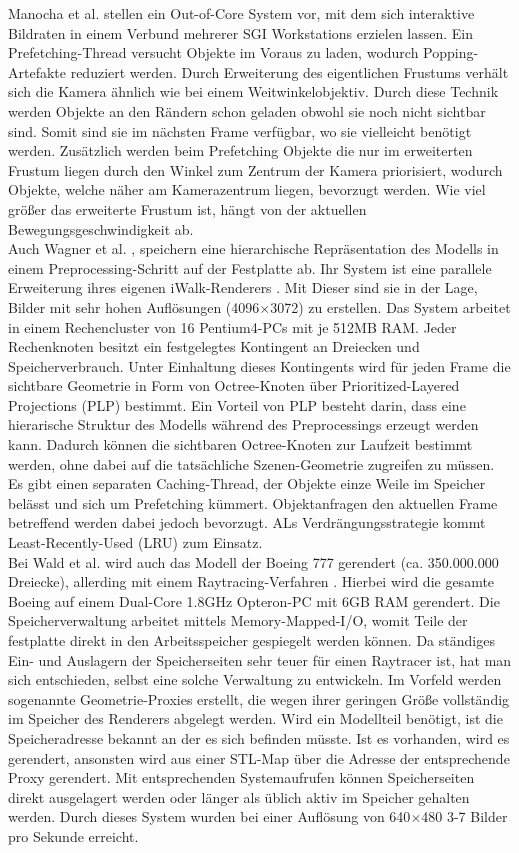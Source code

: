 Manocha et al. \cite{manocha} stellen ein Out-of-Core System vor, mit dem sich interaktive Bildraten in einem Verbund mehrerer SGI Workstations erzielen lassen. Ein Prefetching-Thread versucht Objekte im Voraus zu laden, wodurch Popping-Artefakte reduziert werden. Durch Erweiterung des eigentlichen Frustums verhält sich die Kamera ähnlich wie bei einem Weitwinkelobjektiv. Durch diese Technik werden Objekte an den Rändern schon geladen obwohl sie noch nicht sichtbar sind. Somit sind sie im nächsten Frame verfügbar, wo sie vielleicht benötigt werden. Zusätzlich werden beim Prefetching Objekte die nur im erweiterten Frustum liegen durch den Winkel zum Zentrum der Kamera priorisiert, wodurch Objekte, welche näher am Kamerazentrum liegen, bevorzugt werden. Wie viel größer das erweiterte Frustum ist, hängt von der aktuellen Bewegungsgeschwindigkeit ab.\\
Auch Wagner et al. \cite{wagner1}, \cite{wagner2} speichern eine hierarchische Repräsentation des Modells in einem Preprocessing-Schritt auf der Festplatte ab. Ihr System ist eine parallele Erweiterung ihres eigenen iWalk-Renderers \cite{iwalk}. Mit Dieser sind sie in der Lage, Bilder mit sehr hohen Auflösungen (4096$\times$3072) zu erstellen. Das System arbeitet in einem Rechencluster von 16 Pentium4-PCs mit je 512MB RAM. Jeder Rechenknoten besitzt ein festgelegtes Kontingent an Dreiecken und Speicherverbrauch. Unter Einhaltung dieses Kontingents wird für jeden Frame die sichtbare Geometrie in Form von Octree-Knoten über Prioritized-Layered Projections (PLP)\cite{plp} bestimmt. Ein Vorteil von PLP besteht darin, dass eine hierarische Struktur des Modells während des Preprocessings erzeugt werden kann. Dadurch können die sichtbaren Octree-Knoten zur Laufzeit bestimmt werden, ohne dabei auf die tatsächliche Szenen-Geometrie zugreifen zu müssen. Es gibt einen separaten Caching-Thread, der Objekte einze Weile im Speicher belässt und sich um Prefetching kümmert. Objektanfragen den aktuellen Frame betreffend werden dabei jedoch bevorzugt. ALs Verdrängungsstrategie kommt Least-Recently-Used (LRU) zum Einsatz.\\
Bei Wald et al. \cite{wald} wird auch das Modell der Boeing 777 gerendert (ca. 350.000.000 Dreiecke), allerding mit einem Raytracing-Verfahren \cite{RTR3}. Hierbei wird die gesamte Boeing auf einem Dual-Core 1.8GHz Opteron-PC mit 6GB RAM gerendert. Die Speicherverwaltung arbeitet mittels Memory-Mapped-I/O, womit Teile der festplatte direkt in den Arbeitsspeicher gespiegelt werden können. Da ständiges Ein- und Auslagern der Speicherseiten sehr teuer für einen Raytracer ist, hat man sich entschieden, selbst eine solche Verwaltung zu entwickeln. Im Vorfeld werden sogenannte Geometrie-Proxies erstellt, die wegen ihrer geringen Größe vollständig im Speicher des Renderers abgelegt werden. Wird ein Modellteil benötigt, ist die Speicheradresse bekannt an der es sich befinden müsste. Ist es vorhanden, wird es gerendert, ansonsten wird aus einer STL-Map über die Adresse der entsprechende Proxy gerendert. Mit entsprechenden Systemaufrufen können Speicherseiten direkt ausgelagert werden oder länger als üblich aktiv im Speicher gehalten werden. Durch dieses System wurden bei einer Auflösung von 640$\times$480 3-7 Bilder pro Sekunde erreicht.

%
